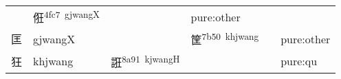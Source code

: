\documentclass[14pt,a4paper]{scrartcl}
\begin{document}
\begin{longtable}[c]{@{}llllll@{}}
\begin{minipage}[t]{0.14\columnwidth}\raggedright\strut
\strut\end{minipage} &
\begin{minipage}[t]{0.14\columnwidth}\raggedright\strut
俇\textsuperscript{4fc7~gjwangX}
\strut\end{minipage} &
\begin{minipage}[t]{0.14\columnwidth}\raggedright\strut
\strut\end{minipage} &
\begin{minipage}[t]{0.14\columnwidth}\raggedright\strut
pure:other
\strut\end{minipage}\tabularnewline
\begin{minipage}[t]{0.14\columnwidth}\raggedright\strut
匡
\strut\end{minipage} &
\begin{minipage}[t]{0.14\columnwidth}\raggedright\strut
gjwangX
\strut\end{minipage} &
\begin{minipage}[t]{0.14\columnwidth}\raggedright\strut
\strut\end{minipage} &
\begin{minipage}[t]{0.14\columnwidth}\raggedright\strut
筐\textsuperscript{7b50~khjwang}
\strut\end{minipage} &
\begin{minipage}[t]{0.14\columnwidth}\raggedright\strut
\strut\end{minipage} &
\begin{minipage}[t]{0.14\columnwidth}\raggedright\strut
pure:other
\strut\end{minipage}\tabularnewline
\begin{minipage}[t]{0.14\columnwidth}\raggedright\strut
狂
\strut\end{minipage} &
\begin{minipage}[t]{0.14\columnwidth}\raggedright\strut
khjwang
\strut\end{minipage} &
\begin{minipage}[t]{0.14\columnwidth}\raggedright\strut
誑\textsuperscript{8a91~kjwangH}
\strut\end{minipage} &
\begin{minipage}[t]{0.14\columnwidth}\raggedright\strut
\strut\end{minipage} &
\begin{minipage}[t]{0.14\columnwidth}\raggedright\strut
\strut\end{minipage} &
\begin{minipage}[t]{0.14\columnwidth}\raggedright\strut
pure:qu
\strut\end{minipage}\tabularnewline
\bottomrule
\end{longtable}
\end{document}
